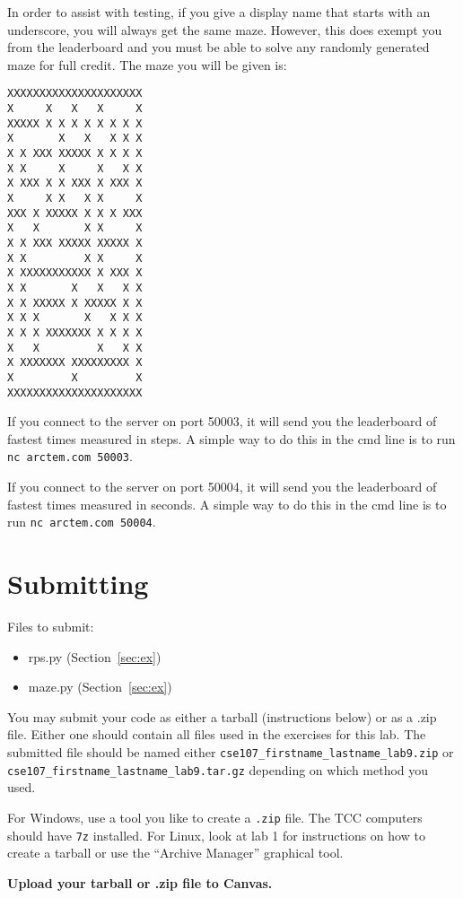 \documentclass[11pt]{cselabheader}
\begin{document}
\begin{description}
  In order to assist with testing, if you give a display name that starts with an underscore, you
  will always get the same maze. However, this does exempt you from the leaderboard and you must
  be able to solve any randomly generated maze for full credit. The maze you will be given is:

  \begin{lstlisting}[style=bash]
XXXXXXXXXXXXXXXXXXXXX
X     X   X   X     X
XXXXX X X X X X X X X
X       X   X   X X X
X X XXX XXXXX X X X X
X X     X     X   X X
X XXX X X XXX X XXX X
X     X X   X X     X
XXX X XXXXX X X X XXX
X   X       X X     X
X X XXX XXXXX XXXXX X
X X         X X     X
X XXXXXXXXXXX X XXX X
X X       X   X   X X
X X XXXXX X XXXXX X X
X X X       X   X X X
X X X XXXXXXX X X X X
X   X         X   X X
X XXXXXXX XXXXXXXXX X
X         X         X
XXXXXXXXXXXXXXXXXXXXX
  \end{lstlisting}

  If you connect to the server on port 50003, it will send you the leaderboard of fastest times
  measured in steps. A simple way to do this in the cmd line is to run
  \lstinline{nc arctem.com 50003}.

  If you connect to the server on port 50004, it will send you the leaderboard of fastest times
  measured in seconds. A simple way to do this in the cmd line is to run
  \lstinline{nc arctem.com 50004}.
  
\end{description}

\pagebreak
\section{Submitting}

Files to submit:
\begin{itemize}
\item rps.py (Section~\ref{sec:ex})
\item maze.py (Section~\ref{sec:ex})
\end{itemize}

You may submit your code as either a tarball (instructions below) or as a .zip
file. Either one should contain all files used in the exercises for this lab.
The submitted file should be named either
\texttt{cse107\_firstname\_lastname\_lab9.zip} or
\texttt{cse107\_firstname\_lastname\_lab9.tar.gz} depending on which method you
used.

For Windows, use a tool you like to create a \texttt{.zip} file. The TCC
computers should have \texttt{7z} installed. For Linux, look at lab 1 for
instructions on how to create a tarball or use the ``Archive Manager'' graphical
tool.

\begin{center}
  \textbf{Upload your tarball or .zip file to Canvas.}
\end{center}
\end{document}
